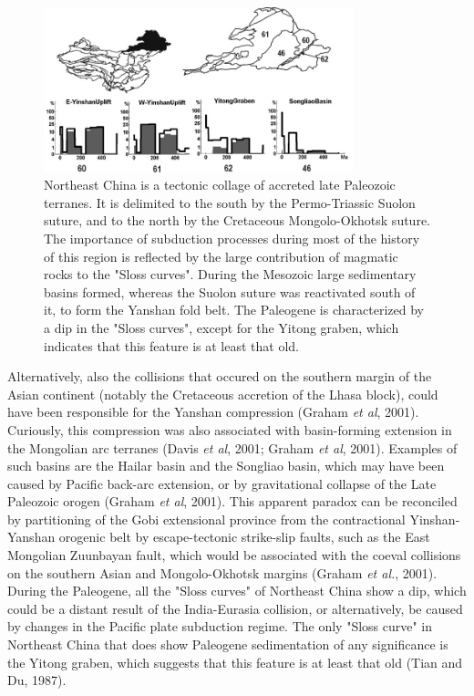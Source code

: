 \documentclass{article}
\begin{document}
 \begin{figure}[here]
 \begin{center}
 \includegraphics[width=0.8\textwidth]{northeasttris.jpg}
 \caption[fig:northeast]{ Northeast  China is  a tectonic  
  collage of accreted late Paleozoic terranes.  It is delimited to the
  south by the  Permo-Triassic Suolon suture, and to  the north by the
  Cretaceous  Mongolo-Okhotsk suture.   The  importance of  subduction
  processes during most of the  history of this region is reflected by
  the  large contribution  of magmatic  rocks to  the  "Sloss curves".
  During  the Mesozoic  large sedimentary  basins formed,  whereas the
  Suolon suture was reactivated south  of it, to form the Yanshan fold
  belt. The Paleogene is characterized by a dip in the "Sloss curves",
  except for the  Yitong graben, which indicates that  this feature is
  at least that old.  }\label{fig:northeast}
 \end{center}
 \end{figure}

 Alternatively,  also  the collisions  that  occured  on the  southern
 margin of  the Asian continent  (notably the Cretaceous  accretion of
 the  Lhasa  block),  could  have  been responsible  for  the  Yanshan
 compression (Graham {\it et  al}, 2001).  Curiously, this compression
 was also associated with basin-forming extension in the Mongolian arc
 terranes  (Davis  {\it et  al},  2001;  Graham  {\it et  al},  2001).
 Examples of such basins are  the Hailar basin and the Songliao basin,
 which  may have  been caused  by  Pacific back-arc  extension, or  by
 gravitational collapse  of the Late Paleozoic orogen  (Graham {\it et
 al}, 2001).  This apparent  paradox can be reconciled by partitioning
 of   the   Gobi   extensional   province   from   the   contractional
 Yinshan-Yanshan orogenic belt  by escape-tectonic strike-slip faults,
 such as the East Mongolian Zuunbayan fault, which would be associated
 with the coeval collisions  on the southern Asian and Mongolo-Okhotsk
 margins (Graham  {\it et al.},  2001).  During the Paleogene,  all the
 "Sloss  curves" of  Northeast  China show  a  dip, which  could be  a
 distant result  of the India-Eurasia collision,  or alternatively, be
 caused by changes  in the Pacific plate subduction  regime.  The only
 "Sloss   curve"  in   Northeast  China   that  does   show  Paleogene
 sedimentation  of  any  significance  is  the  Yitong  graben,  which
 suggests that this feature is at least that old (Tian and Du, 1987).
\end{document}
